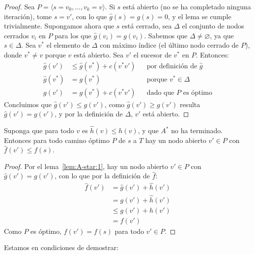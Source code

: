   \begin{proof}
    Sea \(P = \langle s = v_0, \dotsc, v_k = v \rangle\).
    Si \(s\) está abierto
    (no se ha completado ninguna iteración),
    tome \(s = v'\),
    con lo que \(\widehat{g}(s) = g(s) = 0\),
    y el lema se cumple trivialmente.
    Supongamos ahora que \(s\) está cerrado,
    sea \(\Delta\) el conjunto de nodos cerrados \(v_i\) en \(P\)
    para los que \(\widehat{g}(v_i) = g(v_i)\).
    Sabemos que \(\Delta \ne \varnothing\),
    ya que \(s \in \Delta\).
    Sea \(v^*\) el elemento de \(\Delta\) con máximo índice
    (el último nodo cerrado de \(P\)),
    donde \(v^* \ne v\) porque \(v\) está abierto.
    Sea \(v'\) el sucesor de \(v^*\) en \(P\).
    Entonces:
    \begin{align*}
      \widehat{g}(v')
        &\le \widehat{g}(v^*) + c(v^* v')
          && \text{por definición de \(\widehat{g}\)} \\
      \widehat{g}(v^*)
        &=   g(v^*)
          && \text{porque \(v^* \in \Delta\)} \\
      g(v')
        &=   g(v^*) + c(v^* v')
          && \text{dado que \(P\) es óptimo}
    \end{align*}
    Concluimos que \(\widehat{g}(v') \le g(v')\),
    como \(\widehat{g}(v') \ge g(v')\) resulta \(\widehat{g}(v') = g(v')\),
    y por la definición de \(\Delta\),
    \(v'\) está abierto.
  \end{proof}
  \begin{corollary}
    \label{cor:A-star:1}
    Suponga que para todo \(v\) es \(\widehat{h}(v) \le h(v)\),
    y que \(A^*\) no ha terminado.
    Entonces para todo camino óptimo \(P\) de \(s\) a \(T\)
    hay un nodo abierto \(v' \in P\) con \(\widehat{f}(v') \le f(s)\).
  \end{corollary}
  \begin{proof}
    Por el lema~\ref{lem:A-star:1},
    hay un nodo abierto \(v' \in P\) con \(\widehat{g}(v') = g(v')\),
    con lo que por la definición de \(\widehat{f}\):
    \begin{align*}
      \widehat{f}(v')
        &=   \widehat{g}(v') + \widehat{h}(v') \\
        &=   g(v') + \widehat{h}(v') \\
        &\le g(v') + h(v') \\
        &=   f(v')
    \end{align*}
    Como \(P\) es óptimo,
    \(f(v') = f(s)\) para todo \(v' \in P\).
  \end{proof}
  Estamos en condiciones de demostrar:
